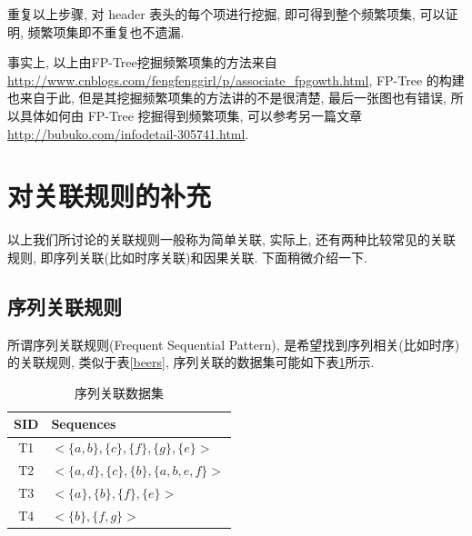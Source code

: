 \documentclass[a4paper,UTF8]{ctexart}
\theoremstyle{plain} \newtheorem{theorem}{定理}[section]
\theoremstyle{plain} \newtheorem{definition}{定义}[section]
\theoremstyle{plain} \newtheorem{lemma}{引理}[section]
\theoremstyle{plain} \newtheorem{proposition}{命题}[section]
\theoremstyle{plain} \newtheorem{example}{例}[section]
\theoremstyle{plain} \newtheorem{remark}{注}[section]
\theoremstyle{plain} \newtheorem{corollary}{推论}[section]
\begin{document}
重复以上步骤, 对 header 表头的每个项进行挖掘, 即可得到整个频繁项集, 可以证明, 频繁项集即不重复也不遗漏.

事实上, 以上由FP-Tree挖掘频繁项集的方法来自\url{http://www.cnblogs.com/fengfenggirl/p/associate_fpgowth.html}, FP-Tree 的构建也来自于此, 但是其挖掘频繁项集的方法讲的不是很清楚, 最后一张图也有错误, 所以具体如何由 FP-Tree 挖掘得到频繁项集, 可以参考另一篇文章\url{http://bubuko.com/infodetail-305741.html}.



\section{对关联规则的补充}
以上我们所讨论的关联规则一般称为简单关联, 实际上, 还有两种比较常见的关联规则, 即序列关联(比如时序关联)和因果关联. 下面稍微介绍一下.


\subsection{序列关联规则}
所谓序列关联规则(Frequent Sequential Pattern), 是希望找到序列相关(比如时序)的关联规则, 类似于表\ref{beers}, 序列关联的数据集可能如下表\ref{seqex}所示.
\begin{table}[!htb]
\centering
\caption{序列关联数据集}
\label{seqex}
\begin{tabular}{c|l}
	\hline
    \textbf{SID} & \textbf{Sequences}  \\
    \hline
    T1 & $<\{a,b\}, \{c\}, \{f\}, \{g\}, \{e\}>$  \\
    \hline
    T2 & $<\{a,d\}, \{c\}, \{b\}, \{a,b,e,f\}>$  \\
    \hline
    T3 & $<\{a\}, \{b\}, \{f\}, \{e\}>$  \\
    \hline
    T4 & $<\{b\}, \{f,g\}>$  \\ 
	\hline
\end{tabular}
\end{table}
\end{document}
